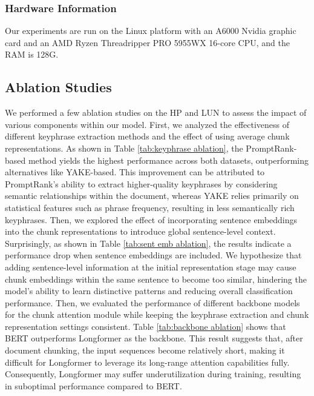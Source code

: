 \documentclass[11pt]{article}
\begin{document}


\subsubsection{Hardware Information}
Our experiments are run on the Linux platform with an A6000 Nvidia graphic card and an AMD Ryzen Threadripper PRO 5955WX 16-core CPU, and the RAM is 128G.



\subsection{Ablation Studies}
\label{app:ablation study}

We performed a few ablation studies on the HP and LUN  to assess the impact of various components within our model. First, we analyzed the effectiveness of different keyphrase extraction methods and the effect of using average chunk representations. As shown in Table \ref{tab:keyphrase ablation}, the PromptRank-based method yields the highest performance across both datasets, outperforming alternatives like YAKE-based. This improvement can be attributed to PromptRank’s ability to extract higher-quality keyphrases by considering semantic relationships within the document, whereas YAKE relies primarily on statistical features such as phrase frequency, resulting in less semantically rich keyphrases. 
Then, we explored the effect of incorporating sentence embeddings into the chunk representations to introduce global sentence-level context. Surprisingly, as shown in Table \ref{tab:sent emb ablation}, the results indicate a performance drop when sentence embeddings are included. We hypothesize that adding sentence-level information at the initial representation stage may cause chunk embeddings within the same sentence to become too similar, hindering the model’s ability to learn distinctive patterns and reducing overall classification performance.
Then, we evaluated the performance of different backbone models for the chunk attention module while keeping the keyphrase extraction and chunk representation settings consistent. Table \ref{tab:backbone ablation} shows that BERT outperforms Longformer as the backbone. This result suggests that, after document chunking, the input sequences become relatively short, making it difficult for Longformer to leverage its long-range attention capabilities fully. Consequently, Longformer may suffer underutilization during training, resulting in suboptimal performance compared to BERT. 
\end{document}

